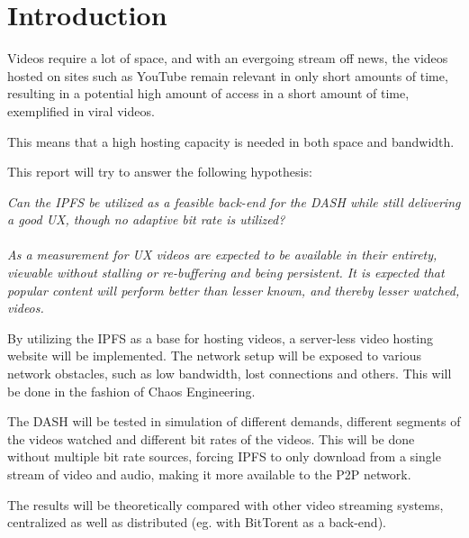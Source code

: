 \chapter{Introduction}
\label{cha:introduction}
Videos require a lot of space, and with an evergoing stream off news, the videos hosted on sites such as YouTube remain relevant in only short amounts of time, resulting in a potential high amount of access in a short amount of time, exemplified in viral videos.

This means that a high hosting capacity is needed in both space and bandwidth.

This report will try to answer the following hypothesis:

\begin{displayquote}
    \textit{
        Can the \acl{IPFS} be utilized as a feasible back-end for the \acl{DASH} while still delivering a good \ac{UX}, though no adaptive bit rate is utilized? \\ \\
        As a measurement for \acs{UX} videos are expected to be available in their entirety, viewable without stalling or re-buffering and being persistent. It is expected that popular content will perform better than lesser known, and thereby lesser watched, videos.
    }
\end{displayquote}

By utilizing the \ac{IPFS} as a base for hosting videos, a server-less video hosting website will be implemented. The network setup will be exposed to various network obstacles, such as low bandwidth, lost connections and others. This will be done in the fashion of Chaos Engineering.

The \ac{DASH} will be tested in simulation of different demands, different segments of the videos watched and different bit rates of the videos. This will be done without multiple bit rate sources, forcing IPFS to only download from a single stream of video and audio, making it more available to the \ac{P2P} network.

The results will be theoretically compared with other video streaming systems, centralized as well as distributed (eg. with BitTorent as a back-end).

